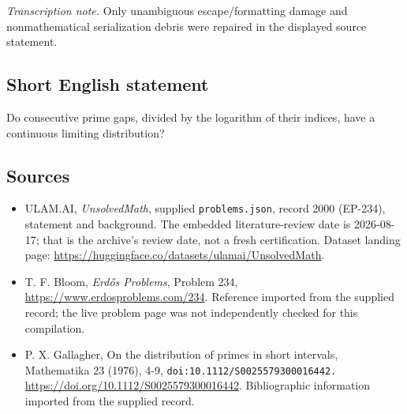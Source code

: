 \documentclass[11pt,a4paper]{article}
\begin{document}
{\small\emph{Transcription note.} Only unambiguous escape/formatting damage and nonmathematical serialization debris were repaired in the displayed source statement.}

\subsection{Short English statement}

Do consecutive prime gaps, divided by the logarithm of their indices, have a continuous limiting distribution?

\subsection{Sources}

{\small

\begin{itemize}

\item[\hypertarget{source:2000:1}{S1}] ULAM.AI, \emph{UnsolvedMath}, supplied \texttt{problems.json}, record 2000 (EP-234), statement and background. The embedded literature-review date is 2026-08-17; that is the archive’s review date, not a fresh certification. Dataset landing page: \url{https://huggingface.co/datasets/ulamai/UnsolvedMath}.

\item[\hypertarget{source:2000:2}{S2}] T. F. Bloom, \emph{Erdős Problems}, Problem 234, \url{https://www.erdosproblems.com/234}. Reference imported from the supplied record; the live problem page was not independently checked for this compilation.

\item[\hypertarget{source:2000:3}{S3}] P. X. Gallagher, On the distribution of primes in short intervals, Mathematika 23 (1976), 4-9, \nolinkurl{doi:10.1112/S0025579300016442.} \url{https://doi.org/10.1112/S0025579300016442}. Bibliographic information imported from the supplied record.

\end{itemize}

}

\label{end:2000}
\end{document}
